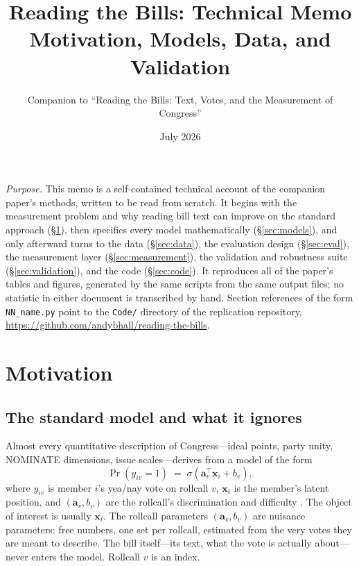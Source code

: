 \documentclass[11pt]{article}
\title{Reading the Bills: Technical Memo\\
\large Motivation, Models, Data, and Validation}
\author{Companion to ``Reading the Bills: Text, Votes, and the
Measurement of Congress''}
\date{July 2026}
\newcommand{\code}[1]{\texttt{#1}}
\begin{document}
\maketitle

\noindent\emph{Purpose.} This memo is a self-contained technical
account of the companion paper's methods, written to be read from
scratch. It begins with the measurement problem and why reading bill
text can improve on the standard approach (\S\ref{sec:motivation}),
then specifies every model mathematically (\S\ref{sec:models}), and
only afterward turns to the data (\S\ref{sec:data}), the evaluation
design (\S\ref{sec:eval}), the measurement layer
(\S\ref{sec:measurement}), the validation and robustness suite
(\S\ref{sec:validation}), and the code (\S\ref{sec:code}). It
reproduces all of the paper's tables and figures, generated by the
same scripts from the same output files; no statistic in either
document is transcribed by hand. Section references of the form
\code{NN\_name.py} point to the \code{Code/} directory of the
replication repository,
\url{https://github.com/andybhall/reading-the-bills}.

\tableofcontents

\section{Motivation}
\label{sec:motivation}

\subsection{The standard model and what it ignores}

Almost every quantitative description of Congress---ideal points,
party unity, NOMINATE dimensions, issue scales---derives from a model
of the form
\begin{equation}
\Pr(y_{iv} = 1) \;=\; \sigma\!\left(\mathbf{a}_v^\top \mathbf{x}_i
+ b_v\right),
\label{eq:classical}
\end{equation}
where $y_{iv}$ is member $i$'s yea/nay vote on rollcall $v$,
$\mathbf{x}_i$ is the member's latent position, and
$(\mathbf{a}_v, b_v)$ are the rollcall's discrimination and difficulty
\citep{poole1997congress, clinton2004statistical}. The object of
interest is usually $\mathbf{x}_i$. The rollcall parameters
$(\mathbf{a}_v, b_v)$ are nuisance parameters: free numbers, one set
per rollcall, estimated from the very votes they are meant to
describe. The bill itself---its text, what the vote is actually
about---never enters the model. Rollcall $v$ is an index.
\end{document}
